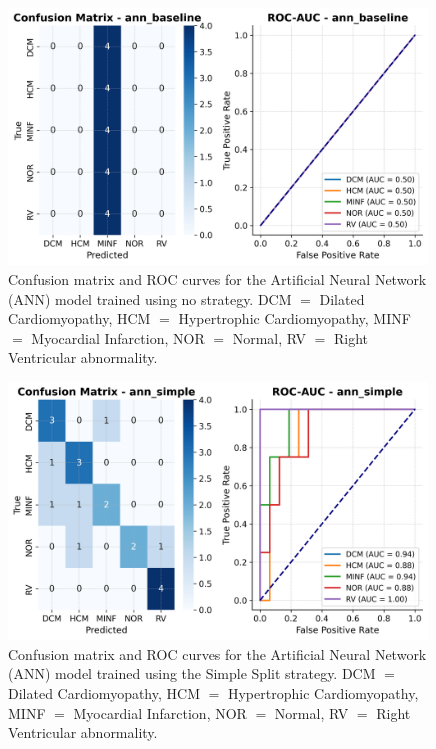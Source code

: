 \begin{figure}
	\begin{center}
		\includegraphics[width=0.99\textwidth]{../images/metrics/ann/ann_baseline_metrics.png}
	\end{center}
	\caption{Confusion matrix and ROC curves for the Artificial Neural Network
		(ANN) model trained using no strategy. DCM $=$ Dilated Cardiomyopathy, HCM
		$=$ Hypertrophic Cardiomyopathy, MINF $=$ Myocardial Infarction, NOR $=$
		Normal, RV $=$ Right Ventricular abnormality.}
\end{figure}

\begin{figure}
	\begin{center}
		\includegraphics[width=0.99\textwidth]{../images/metrics/ann/ann_simple_metrics.png}
	\end{center}
	\caption{Confusion matrix and ROC curves for the Artificial Neural Network
		(ANN) model trained using the Simple Split strategy. DCM $=$ Dilated
		Cardiomyopathy, HCM $=$ Hypertrophic Cardiomyopathy, MINF $=$ Myocardial
		Infarction, NOR $=$ Normal, RV $=$ Right Ventricular abnormality.}
\end{figure}

